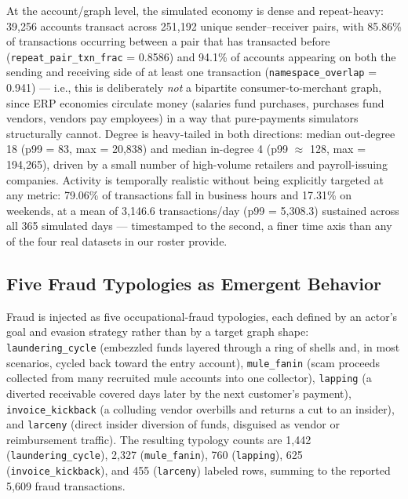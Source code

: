 At the account/graph level, the simulated economy is dense and repeat-heavy:
39{,}256 accounts transact across 251{,}192 unique sender--receiver pairs,
with 85.86\% of transactions occurring between a pair that has transacted
before (\texttt{repeat\_pair\_txn\_frac} = 0.8586) and 94.1\% of accounts
appearing on both the sending and receiving side of at least one transaction
(\texttt{namespace\_overlap} = 0.941) — i.e., this is deliberately \emph{not}
a bipartite consumer-to-merchant graph, since ERP economies circulate money
(salaries fund purchases, purchases fund vendors, vendors pay employees) in a
way that pure-payments simulators structurally cannot. Degree is heavy-tailed
in both directions: median out-degree 18 (p99 = 83, max = 20{,}838) and
median in-degree 4 (p99 $\approx$ 128, max = 194{,}265), driven by a small
number of high-volume retailers and payroll-issuing companies. Activity is
temporally realistic without being explicitly targeted at any metric: 79.06\%
of transactions fall in business hours and 17.31\% on weekends, at a mean of
3{,}146.6 transactions/day (p99 = 5{,}308.3) sustained across all 365 simulated
days — timestamped to the second, a finer time axis than any of the four real
datasets in our roster provide.

\subsection{Five Fraud Typologies as Emergent Behavior}
\label{sec:synthetic-emergence}

Fraud is injected as five occupational-fraud typologies, each defined by an
actor's goal and evasion strategy rather than by a target graph shape:
\texttt{laundering\_cycle} (embezzled funds layered through a ring of shells
and, in most scenarios, cycled back toward the entry account), \texttt{mule\_fanin}
(scam proceeds collected from many recruited mule accounts into one
collector), \texttt{lapping} (a diverted receivable covered days later by the
next customer's payment), \texttt{invoice\_kickback} (a colluding vendor
overbills and returns a cut to an insider), and \texttt{larceny} (direct
insider diversion of funds, disguised as vendor or reimbursement traffic). The
resulting typology counts are 1{,}442 (\texttt{laundering\_cycle}), 2{,}327
(\texttt{mule\_fanin}), 760 (\texttt{lapping}), 625 (\texttt{invoice\_kickback}),
and 455 (\texttt{larceny}) labeled rows, summing to the reported 5{,}609
fraud transactions.

